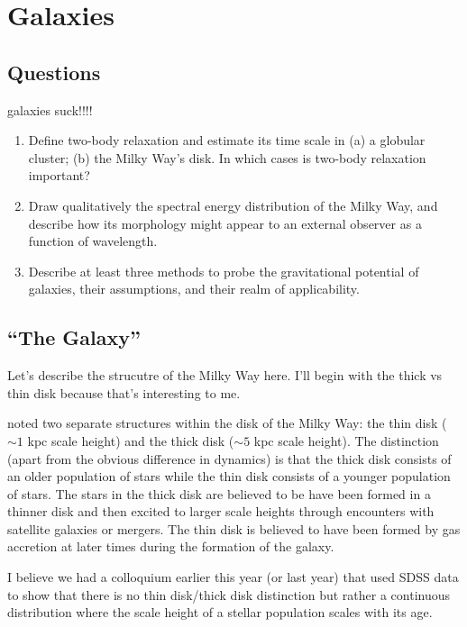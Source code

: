 \section{Galaxies}
\subsection{Questions}
galaxies suck!!!!
\begin{enumerate}
\item Define two-body relaxation and estimate its time scale in (a) a globular cluster; (b)
      the Milky Way's disk. In which cases is two-body relaxation important?
\item Draw qualitatively the spectral energy distribution of the Milky Way, and describe
      how its morphology might appear to an external observer as a function of wavelength.
\item Describe at least three methods to probe the gravitational potential of galaxies,
      their assumptions, and their realm of applicability.
\end{enumerate}

\subsection{``The Galaxy''}

Let's describe the strucutre of the Milky Way here.  I'll begin with the thick vs thin disk
because that's interesting to me.

 noted two separate structures within the disk of the
Milky Way: the thin disk ($\sim1$ kpc scale height) and the thick disk
($\sim5$ kpc scale height).  The distinction (apart from the obvious difference in dynamics)
is that the thick disk consists of an older population of stars while the thin disk consists
of a younger population of stars.
The stars in the thick disk are believed to be have been formed in a thinner disk and then
excited to larger scale heights through encounters with satellite galaxies or mergers.
The thin disk is believed to have been formed by gas
accretion at later times during the formation of the galaxy.

I believe we had a colloquium earlier this year (or last year) that used SDSS data to show
that there is no thin disk/thick disk distinction but rather a continuous distribution
where the scale height of a stellar population scales with its age.

